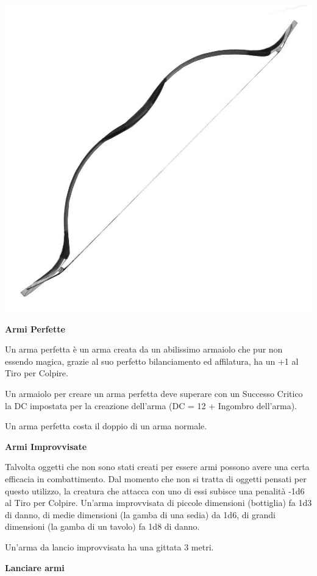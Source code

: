 \begin{multicols}{2}
\begin{center}
	\includegraphics[width=0.7\linewidth]{immagini/bow2.png}
\end{center}

\medskip

\textbf{Armi Perfette}

Un arma perfetta è un arma creata da un abilissimo armaiolo che pur non essendo magica, grazie al suo perfetto bilanciamento ed affilatura, ha un +1 al Tiro per Colpire.

Un armaiolo per creare un arma perfetta deve superare con un Successo Critico la DC impostata per la creazione dell'arma (DC = 12 + Ingombro dell'arma).

Un arma perfetta costa il doppio di un arma normale.

\textbf{Armi Improvvisate}\label{armaimprovvisata}\hypertarget{armaimprovvisata}{}

Talvolta oggetti che non sono stati creati per essere armi possono avere una certa efficacia in combattimento. Dal momento che non si tratta di oggetti pensati per questo utilizzo, la creatura che attacca con uno di essi subisce una penalità -1d6 al Tiro per Colpire. Un'arma improvvisata di piccole dimensioni (bottiglia) fa 1d3 di danno, di medie dimensioni (la gamba di una sedia) da 1d6, di grandi dimensioni (la gamba di un tavolo) fa 1d8 di danno.

Un'arma da lancio improvvisata ha una gittata 3 metri.

\medskip

\textbf{Lanciare armi}


\end{multicols}
